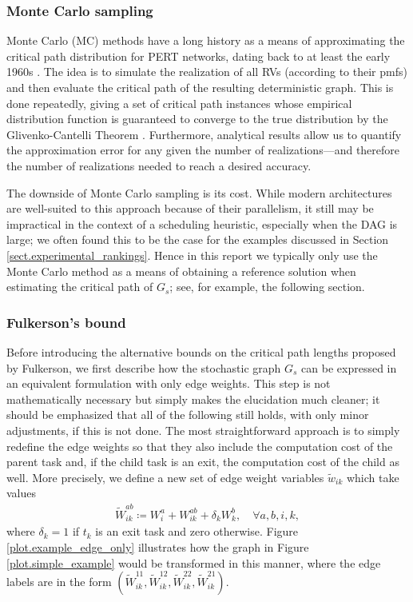 \documentclass[12pt]{article}
\begin{document}
\subsubsection{Monte Carlo sampling}
\label{subsubsect.monte_carlo}

Monte Carlo (MC) methods have a long history as a means of approximating the critical path distribution for PERT networks, dating back to at least the early 1960s \cite{van1963letter}. The idea is to simulate the realization of all RVs (according to their pmfs) and then evaluate the critical path of the resulting deterministic graph. This is done repeatedly, giving a set of critical path instances whose empirical distribution function is guaranteed to converge to the true distribution by the Glivenko-Cantelli Theorem \cite{canon2016correlation}. Furthermore, analytical results allow us to quantify the approximation error for any given the number of realizations---and therefore the number of realizations needed to reach a desired accuracy.  

The downside of Monte Carlo sampling is its cost. While modern architectures are well-suited to this approach because of their parallelism, it still may be impractical in the context of a scheduling heuristic, especially when the DAG is large; we often found this to be the case for the examples discussed in Section \ref{sect.experimental_rankings}. Hence in this report we typically only use the Monte Carlo method as a means of obtaining a reference solution when estimating the critical path of $G_s$; see, for example, the following section. 

\subsubsection{Fulkerson's bound}
\label{subsubsect.fulkerson}

Before introducing the alternative bounds on the critical path lengths proposed by Fulkerson, we first describe how the stochastic graph $G_s$ can be expressed in an equivalent formulation with only edge weights. This step is not mathematically necessary but simply makes the elucidation much cleaner; it should be emphasized that all of the following still holds, with only minor adjustments, if this is not done. The most straightforward approach is to simply redefine the edge weights so that they also include the computation cost of the parent task and, if the child task is an exit, the computation cost of the child as well. More precisely, we define a new set of edge weight variables $\tilde{w}_{ik}$ which take values 
\begin{align*}
\tilde{W}_{ik}^{ab} \coloneqq W_i^a + W_{ik}^{ab} + \delta_k W_k^b,  \quad \forall a, b, i, k, 
\end{align*}
where $\delta_k = 1$ if $t_k$ is an exit task and zero otherwise. Figure \ref{plot.example_edge_only} illustrates how the graph in Figure \ref{plot.simple_example} would be transformed in this manner, where the edge labels are in the form $(\tilde{W}_{ik}^{11}, \tilde{W}_{ik}^{12}, \tilde{W}_{ik}^{22}, \tilde{W}_{ik}^{21})$.
\end{document}

